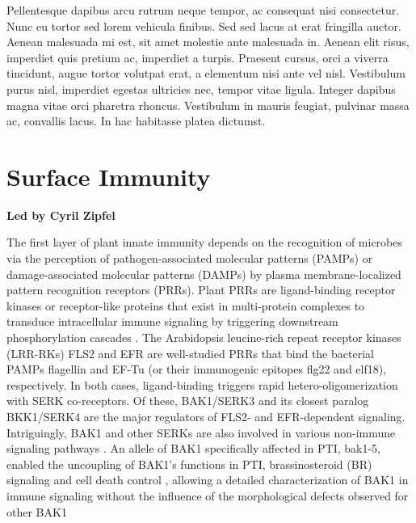 \documentclass[12pt,]{book}
\begin{document}
Pellentesque dapibus arcu rutrum neque tempor, ac consequat nisi
consectetur. Nunc eu tortor sed lorem vehicula finibus. Sed sed lacus at
erat fringilla auctor. Aenean malesuada mi est, sit amet molestie ante
malesuada in. Aenean elit risus, imperdiet quis pretium ac, imperdiet a
turpis. Praesent cursus, orci a viverra tincidunt, augue tortor volutpat
erat, a elementum nisi ante vel nisl. Vestibulum purus nisl, imperdiet
egestas ultricies nec, tempor vitae ligula. Integer dapibus magna vitae
orci pharetra rhoncus. Vestibulum in mauris feugiat, pulvinar massa ac,
convallis lacus. In hac habitasse platea dictumst.

\chapter*{Surface Immunity}\label{surface-immunity}

\textbf{Led by Cyril Zipfel}

The first layer of plant innate immunity depends on the recognition of
microbes via the perception of pathogen-associated molecular patterns
(PAMPs) or damage-associated molecular patterns (DAMPs) by plasma
membrane-localized pattern recognition receptors (PRRs). Plant PRRs are
ligand-binding receptor kinases or receptor-like proteins that exist in
multi-protein complexes to transduce intracellular immune signaling by
triggering downstream phosphorylation cascades \citep{Couto:2016kq}. The
Arabidopsis leucine-rich repeat receptor kinases (LRR-RKs) FLS2 and EFR
are well-studied PRRs that bind the bacterial PAMPs flagellin and EF-Tu
(or their immunogenic epitopes flg22 and elf18), respectively. In both
cases, ligand-binding triggers rapid hetero-oligomerization with SERK
co-receptors. Of these, BAK1/SERK3 and its closest paralog BKK1/SERK4
are the major regulators of FLS2- and EFR-dependent signaling.
Intriguingly, BAK1 and other SERKs are also involved in various
non-immune signaling pathways \citep{Ma:2016eu}. An allele of BAK1
specifically affected in PTI, bak1-5, enabled the uncoupling of BAK1's
functions in PTI, brassinosteroid (BR) signaling and cell death control
\citep{Schwessinger:2011ku}, allowing a detailed characterization of
BAK1 in immune signaling without the influence of the morphological
defects observed for other BAK1
\end{document}
